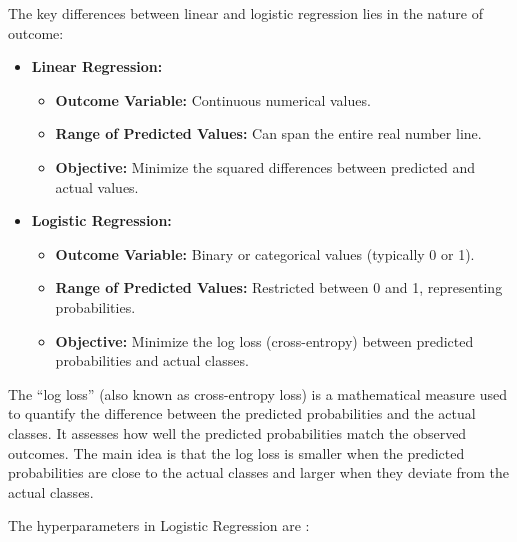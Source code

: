 The key differences between linear and logistic regression lies in the nature of outcome:

\begin{itemize}
    \item \textbf{Linear Regression:}
        \begin{itemize}
          \item \textbf{Outcome Variable:} Continuous numerical values.
          \item \textbf{Range of Predicted Values:} Can span the entire real number line.
          \item \textbf{Objective:} Minimize the squared differences between predicted and actual values.
        \end{itemize}
        
    \item \textbf{Logistic Regression:}
        \begin{itemize}
          \item \textbf{Outcome Variable:} Binary or categorical values (typically 0 or 1).
          \item \textbf{Range of Predicted Values:} Restricted between 0 and 1, representing probabilities.
          \item \textbf{Objective:} Minimize the log loss (cross-entropy) between predicted probabilities and actual classes.
        \end{itemize}
\end{itemize}

The ``log loss'' (also known as cross-entropy loss) is a mathematical measure used to quantify the difference between the predicted probabilities and the actual classes. It assesses how well the predicted probabilities match the observed outcomes. The main idea is that the log loss is smaller when the predicted probabilities are close to the actual classes and larger when they deviate from the actual classes.

The hyperparameters in Logistic Regression are \citep{scikit-learn}:

